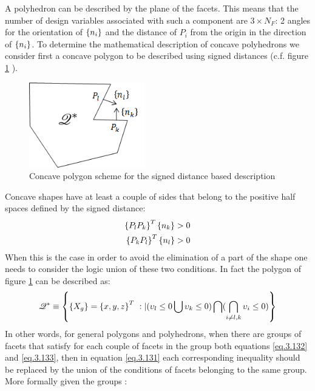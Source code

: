      A polyhedron can be described by the plane of the facets. This means that the number of design variables associated with such a component are $3\times N_F$: 2 angles for the orientation of  $\left\lbrace{n_i}\right \rbrace$ and the distance of $P_i$ from the origin in the direction of  $\left\lbrace{n_i}\right \rbrace$. 
    To determine the mathematical description of concave polyhedrons we consider first a concave polygon to be described using signed distances (c.f. figure \ref{fig:3.33} ). 
\begin{figure}[!ht]
            \centering
             \includegraphics[width=0.45\textwidth]{images/Ch3/concave_polygon}
           \caption{Concave polygon scheme for the signed distance based description}
           \label{fig:3.33}       %
\end{figure}
Concave shapes have at least a couple of sides that belong to the positive half spaces defined by the signed distance:
     \begin{eqnarray} 
     \label{eq.3.132}
     \left\lbrace{P_lP_k}\right \rbrace^T\left\lbrace{n_k}\right \rbrace>0\\
     \label{eq.3.133}
     \left\lbrace{P_kP_l}\right \rbrace^T\left\lbrace{n_l}\right \rbrace>0
     \end{eqnarray}
     When this is the case in order to avoid the elimination of a part of the shape one needs to consider the logic union of these two conditions. In fact the polygon of figure  \ref{fig:3.33} can be described as: 
   \begin{equation}
           \label{eq.3.134}
           \mathscr{Q^*} \equiv\left\lbrace{\ensuremath\left\lbrace{X_g}\right \rbrace=\ensuremath\left\lbrace{x,y,z}\right \rbrace^T\ :| (\upsilon_l\leq 0\bigcup\upsilon_k\leq 0)\bigcap(\bigcap_{i\neq l,k}{\upsilon_i\leq 0})}\right \rbrace
    \end{equation}
    In other words, for general polygons and polyhedrons, when there are groups of facets that satisfy for each couple of facets in the group both equations \ref{eq.3.132} and \ref{eq.3.133}, then in equation \ref{eq.3.131} each corresponding inequality should be replaced by the union of the conditions of facets belonging to the same group. More formally given the groups :
